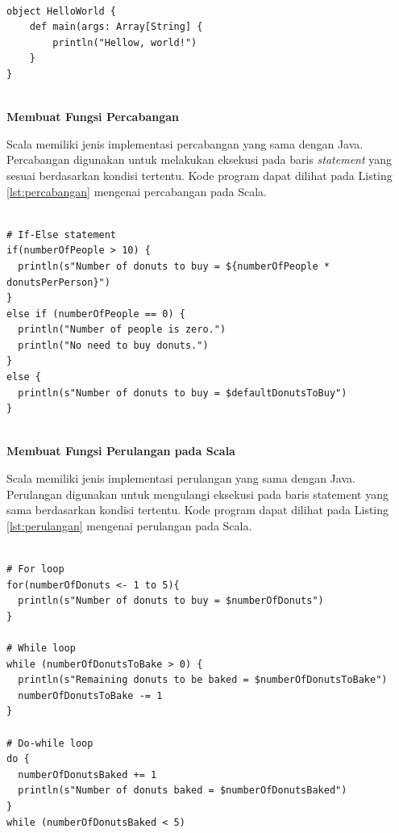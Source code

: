 \documentclass[a4paper,twoside]{article}
\begin{document}
\begin{enumerate}
\begin{lstlisting}[basicstyle=\ttfamily, frame=single,
	columns=fullflexible, keepspaces=true, breaklines=true, label=lst:main_method, caption=Membuat Main Method pada Scala]
	
object HelloWorld {
	def main(args: Array[String] {
		println("Hellow, world!")
	}
}
	
\end{lstlisting}

\textbf{Membuat Fungsi Percabangan}

Scala memiliki jenis implementasi percabangan yang sama dengan Java. Percabangan digunakan untuk melakukan eksekusi pada baris \textit{statement} yang sesuai berdasarkan kondisi tertentu. Kode program dapat dilihat pada Listing \ref{lst:percabangan} mengenai percabangan pada Scala.

\begin{lstlisting}[basicstyle=\ttfamily, frame=single,
	columns=fullflexible, keepspaces=true, breaklines=true, label=lst:percabangan, caption=Membuat Fungsi Percabangan pada Scala]

# If-Else statement
if(numberOfPeople > 10) { 
  println(s"Number of donuts to buy = ${numberOfPeople * donutsPerPerson}")
}
else if (numberOfPeople == 0) {
  println("Number of people is zero.")
  println("No need to buy donuts.")
} 
else {
  println(s"Number of donuts to buy = $defaultDonutsToBuy")
}
	
\end{lstlisting}

\textbf{Membuat Fungsi Perulangan pada Scala}

Scala memiliki jenis implementasi perulangan yang sama dengan Java. Perulangan digunakan untuk mengulangi eksekusi pada baris statement yang sama berdasarkan kondisi tertentu. Kode program dapat dilihat pada Listing \ref{lst:perulangan} mengenai perulangan pada Scala.

\begin{lstlisting}[basicstyle=\ttfamily, frame=single,
	columns=fullflexible, keepspaces=true, breaklines=true, label=lst:perulangan, caption=Membuat Fungsi Perulangan pada Scala]
	
# For loop
for(numberOfDonuts <- 1 to 5){
  println(s"Number of donuts to buy = $numberOfDonuts")
}

# While loop
while (numberOfDonutsToBake > 0) {
  println(s"Remaining donuts to be baked = $numberOfDonutsToBake")
  numberOfDonutsToBake -= 1
}

# Do-while loop
do {
  numberOfDonutsBaked += 1
  println(s"Number of donuts baked = $numberOfDonutsBaked")
} 
while (numberOfDonutsBaked < 5)


\end{lstlisting}
\end{enumerate}
\end{document}
